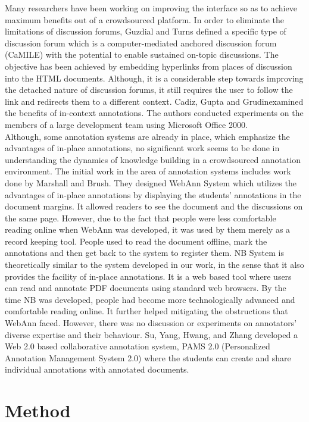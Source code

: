 \documentclass{llncs}
\begin{document}
Many researchers have been working on improving the interface so as to achieve maximum benefits out of a crowdsourced platform. In order to eliminate the limitations of discussion forums, Guzdial and Turns\cite{Guzdial2000} defined a specific type of discussion forum which is a computer-mediated anchored discussion forum (CaMILE) with the potential to enable sustained on-topic discussions. The objective has been achieved by embedding hyperlinks from places of discussion into the HTML documents.  Although, it is a considerable step towards improving the detached nature of discussion forums, it still requires the user to follow the link and redirects them to a different context. Cadiz, Gupta and Grudin\cite{Cadiz2000}examined the benefits of in-context annotations. The authors conducted experiments on the members of a large development team using Microsoft Office 2000. \\

Although, some annotation systems are already in place, which emphasize the advantages of in-place annotations, no significant work seems to be done in understanding the dynamics of knowledge building in a crowdsourced annotation environment. The initial work in the area of annotation systems includes work done by Marshall and Brush\cite{Marshall2002}. They designed WebAnn System which utilizes the advantages of in-place annotations by displaying the students’ annotations in the document margins. It allowed readers to see the document and the discussions on the same page. However, due to the fact that people were less comfortable reading online when WebAnn was developed, it was used by them merely as a record keeping tool. People used to read the document offline, mark the annotations and then get back to the system to register them. NB System\cite{Zyto2012} is theoretically similar to the system developed in our work, in the sense that it also provides the facility of in-place annotations. It is a web based tool where users can read and annotate PDF documents using standard web browsers. By the time NB was developed, people had become more technologically advanced and comfortable reading online. It further helped mitigating the obstructions that WebAnn faced. However, there was no discussion or experiments on annotators’ diverse expertise and their behaviour. Su, Yang, Hwang, and Zhang\cite{Su2010} developed a Web 2.0 based collaborative annotation system, PAMS 2.0 (Personalized Annotation Management System 2.0) where the students can create and share individual annotations with annotated documents.
\section{Method}
\end{document}
